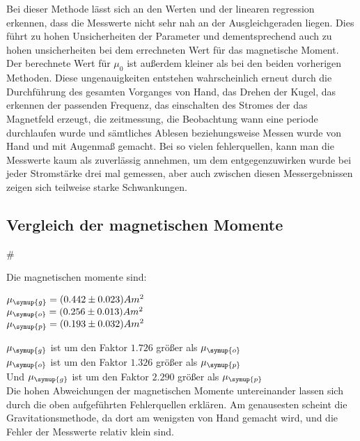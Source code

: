 Bei dieser Methode lässt sich an den Werten und der linearen regression erkennen, dass die Messwerte nicht sehr nah an der Ausgleichgeraden liegen. Dies führt zu hohen Unsicherheiten der Parameter und dementsprechend auch zu hohen unsicherheiten bei dem errechneten Wert
für das magnetische Moment. Der berechnete Wert für $\mu_0$ ist außerdem kleiner als bei den beiden vorherigen Methoden.
Diese ungenauigkeiten entstehen wahrscheinlich erneut durch die Durchführung des gesamten Vorganges von Hand, das Drehen der Kugel, das erkennen der passenden Frequenz, das einschalten des Stromes der das Magnetfeld erzeugt, die zeitmessung, die Beobachtung wann eine periode durchlaufen wurde und sämtliches Ablesen beziehungsweise Messen wurde von Hand und mit Augenmaß
gemacht. Bei so vielen fehlerquellen, kann man die Messwerte kaum als zuverlässig annehmen, um dem entgegenzuwirken wurde bei jeder Stromstärke drei mal gemessen, aber auch zwischen diesen Messergebnissen zeigen sich teilweise starke Schwankungen.

\subsection{Vergleich der magnetischen Momente}#

Die magnetischen momente sind:\\

\begin{centering}

$\mu_{\symup{g}} = (0.442 \pm 0.023) Am^2$\\
$\mu_{\symup{o}} = (0.256 \pm 0.013) Am^2$\\
$\mu_{\symup{p}} = (0.193 \pm 0.032) Am^2$\\

\end{centering}

$\mu_{\symup{g}}$ ist um den Faktor $1.726$ größer als $\mu_{\symup{o}}$\\
$\mu_{\symup{o}}$ ist um den Faktor $1.326$ größer als $\mu_{\symup{p}}$\\
Und $\mu_{\symup{g}}$ ist um den Faktor $2.290$ größer als $\mu_{\symup{p}}$\\

Die hohen Abweichungen der magnetischen Momente untereinander lassen sich durch die oben aufgeführten Fehlerquellen erklären.
Am genausesten scheint die Gravitationsmethode, da dort am wenigsten von Hand gemacht wird, und die Fehler der Messwerte relativ klein sind.